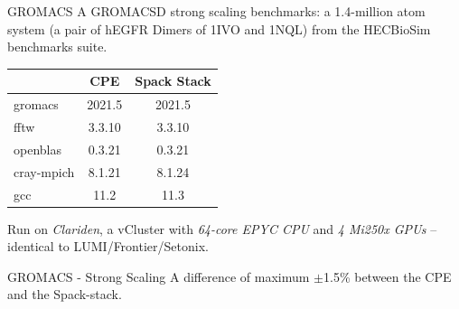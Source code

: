 \documentclass[aspectratio=43]{beamer}
\begin{document}
\begin{frame}[fragile]{GROMACS}
    A GROMACSD strong scaling benchmarks: a 1.4-million atom system (a pair of hEGFR Dimers of 1IVO and 1NQL) from the HECBioSim benchmarks suite.
\begin{center}
    \begin{tabular}{|l |c  c| }
        \cline{2-3}
\multicolumn{1}{c|}{} & CPE   & Spack Stack \\
        \hline
        gromacs       & 2021.5   & 2021.5   \\
        fftw          & 3.3.10   & 3.3.10   \\
        openblas      & 0.3.21   & 0.3.21   \\
        cray-mpich    & 8.1.21   & 8.1.24   \\
        gcc           & 11.2     & 11.3     \\
          \hline
    \end{tabular}
\end{center}

    Run on \emph{Clariden}, a vCluster with \emph{64-core EPYC CPU} and  \emph{4 Mi250x GPUs} -- identical to LUMI/Frontier/Setonix.
\end{frame}

\begin{frame}[fragile]{GROMACS - Strong Scaling}
    A difference of maximum $\pm$1.5\% between the CPE and the Spack-stack.
    \begin{center}
        
    \end{center}
\end{frame}


\end{document}
